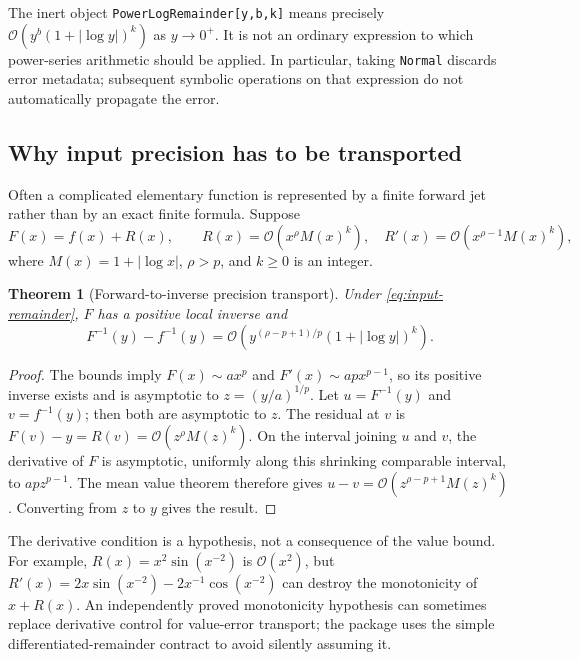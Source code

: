 \documentclass[11pt,a4paper]{article}
\numberwithin{equation}{section}
\newtheorem{theorem}{Theorem}[section]
\theoremstyle{definition}
\theoremstyle{remark}
\newcommand{\OO}{\mathcal O}
\begin{document}
The inert object \texttt{PowerLogRemainder[y,b,k]} means precisely
$\OO(y^b(1+|\log y|)^k)$ as $y\to0^+$. It is not an ordinary expression to
which power-series arithmetic should be applied. In particular, taking
\texttt{Normal} discards error metadata; subsequent symbolic operations on
that expression do not automatically propagate the error.

\subsection{Why input precision has to be transported}

Often a complicated elementary function is represented by a finite forward
jet rather than by an exact finite formula. Suppose
\begin{equation}
 F(x)=f(x)+R(x),\qquad
 R(x)=\OO(x^\rho M(x)^k),\quad
 R'(x)=\OO(x^{\rho-1}M(x)^k),
 \label{eq:input-remainder}
\end{equation}
where $M(x)=1+|\log x|$, $\rho>p$, and $k\ge0$ is an integer.

\begin{theorem}[Forward-to-inverse precision transport]
Under \eqref{eq:input-remainder}, $F$ has a positive local inverse and
\begin{equation}
 F^{-1}(y)-f^{-1}(y)=
 \OO\left(y^{(\rho-p+1)/p}(1+|\log y|)^k\right).
 \label{eq:precision-transport}
\end{equation}
\end{theorem}
\begin{proof}
The bounds imply $F(x)\sim ax^p$ and $F'(x)\sim apx^{p-1}$, so its
positive inverse exists and is asymptotic to $z=(y/a)^{1/p}$.
Let $u=F^{-1}(y)$ and $v=f^{-1}(y)$; then both are asymptotic to $z$.
The residual at $v$ is $F(v)-y=R(v)=\OO(z^\rho M(z)^k)$.
On the interval joining $u$ and $v$, the derivative of $F$ is asymptotic,
uniformly along this shrinking comparable interval, to $apz^{p-1}$.
The mean value theorem therefore gives
$u-v=\OO(z^{\rho-p+1}M(z)^k)$. Converting from $z$ to $y$ gives the result.
\end{proof}

The derivative condition is a hypothesis, not a consequence of the value
bound. For example, $R(x)=x^2\sin(x^{-2})$ is $\OO(x^2)$, but
$R'(x)=2x\sin(x^{-2})-2x^{-1}\cos(x^{-2})$ can destroy the monotonicity of
$x+R(x)$. An independently proved monotonicity hypothesis can sometimes
replace derivative control for value-error transport; the package uses the
simple differentiated-remainder contract to avoid silently assuming it.
\end{document}
